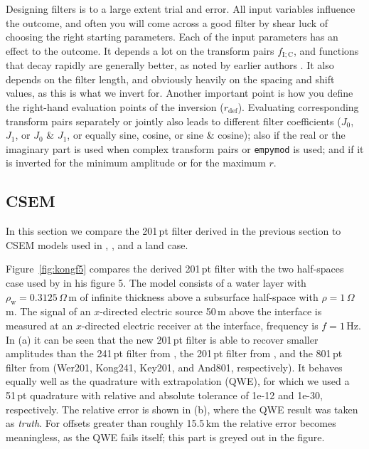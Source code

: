 \documentclass[paper,twocolumn,twoside]{geophysics}
\newcommand{\mr}[1]{\mathrm{#1}}
\begin{document}
Designing filters is to a large extent trial and error. All input variables
influence the outcome, and often you will come across a good filter by shear
luck of choosing the right starting parameters. Each of the input parameters
has an effect to the outcome. It depends a lot on the transform pairs
$f_\mr{I;C}$, and functions that decay rapidly are generally better, as noted
by earlier authors \citep[e.g.][]{USGS.75.Anderson}. It also depends on the
filter length, and obviously heavily on the spacing and shift values, as this
is what we invert for. Another important point is how you define the right-hand
evaluation points of the inversion ($r_\mr{def}$). Evaluating corresponding
transform pairs separately or jointly also leads to different filter
coefficients ($J_0$, $J_1$, or $J_0$ \& $J_1$, or equally sine, cosine, or sine
\& cosine); also if the real or the imaginary part is used when complex
transform pairs or \texttt{empymod} is used; and if it is inverted for the
minimum amplitude or for the maximum $r$.

\subsection{CSEM}
In this section we compare the 201\,pt filter derived in the previous section
to CSEM models used in \cite{GP.07.Kong}, \cite{GEO.12.Key}, and a land case.

Figure~\ref{fig:kongf5} compares the derived 201\,pt filter with the two
half-spaces case used by \cite{GP.07.Kong} in his figure 5. The model consists
of a water layer with $\rho_\mr{w} = 0.3125\,\Omega\,$m of infinite thickness
above a subsurface half-space with $\rho = 1\,\Omega\,$m. The signal of an
$x$-directed electric source 50\,m above the interface is measured at an
$x$-directed electric receiver at the interface, frequency is $f=1\,$Hz.
%
%
In (a) it can be seen that the new 201\,pt filter is able to recover smaller
amplitudes than the 241\,pt filter from \cite{GP.07.Kong}, the 201\,pt filter
from \cite{GEO.12.Key}, and the 801\,pt filter from \cite{TMS.82.Anderson}
(Wer201, Kong241, Key201, and And801, respectively). It behaves equally well as
the quadrature with extrapolation (QWE), for which we used a 51\,pt quadrature
with relative and absolute tolerance of 1e-12 and 1e-30, respectively. The
relative error is shown in (b), where the QWE result was taken as \emph{truth}.
For offsets greater than roughly 15.5\,km the relative error becomes
meaningless, as the QWE fails itself; this part is greyed out in the figure.
\end{document}
